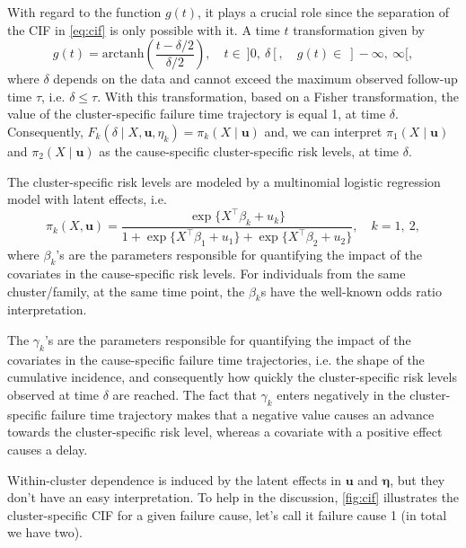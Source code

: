 With regard to the function \(g(t)\), it plays a crucial role since the
separation of the CIF in \autoref{eq:cif} is only possible with it. A
time \(t\) transformation given by
\[
  g(t) = \text{arctanh}\left(\frac{t - \delta/2}{\delta/2}\right),
  \quad t\in~]0,~\delta[, \quad g(t)\in~]-\infty,~\infty[,
\]
where \(\delta\) depends on the data and cannot exceed the maximum
observed follow-up time \(\tau\), i.e. \(\delta \leq \tau\). With this
transformation, based on a Fisher transformation, the value of the
cluster-specific failure time trajectory is equal 1, at time \(\delta\).
Consequently, \(F_{k} (\delta \mid X, \bm{u}, \eta_{k}) = \pi_{k}(X \mid
\bm{u})\) and, we can interpret \(\pi_{1}(X \mid \bm{u})\) and
\(\pi_{2}(X \mid \bm{u})\) as the cause-specific cluster-specific risk
levels, at time \(\delta\).

The cluster-specific risk levels are modeled by a multinomial logistic
regression model with latent effects, i.e.
\begin{equation}
  \pi_{k}(X, \bm{u}) =
  \frac{\exp\{X^{\top}\beta_{k} + u_{k}\}}{1 +
    \exp\{X^{\top}\beta_{1} + u_{1}\} +
    \exp\{X^{\top}\beta_{2} + u_{2}\}}, \quad k = 1,~2,
  \label{eq:risklevel}
\end{equation}
where \(\beta_{k}\)'s are the parameters responsible for quantifying the
impact of the covariates in the cause-specific risk levels. For
individuals from the same chuster/family, at the same time point, the
\(\beta_{k}\)s have the well-known odds ratio interpretation.

The \(\gamma_{k}\)'s are the parameters responsible for quantifying the
impact of the covariates in the cause-specific failure time
trajectories, i.e. the shape of the cumulative incidence, and
consequently how quickly the cluster-specific risk levels observed at
time \(\delta\) are reached. The fact that \(\gamma_{k}\) enters
negatively in the cluster-specific failure time trajectory makes that a
negative value causes an advance towards the cluster-specific risk
level, whereas a covariate with a positive effect causes a delay.

Within-cluster dependence is induced by the latent effects in \(\bm{u}\)
and \(\bm{\eta}\), but they don't have an easy interpretation. To help
in the discussion, \autoref{fig:cif} illustrates the cluster-specific
CIF for a given failure cause, let's call it failure cause 1 (in total
we have two).

